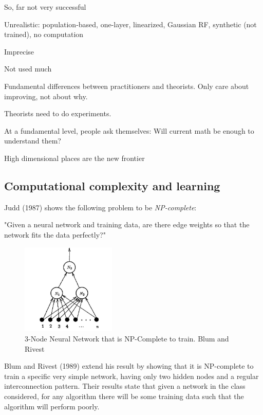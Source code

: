 \documentclass[english]{article}
\begin{document}
\item So, far not very successful
\bitem
\item Unrealistic: population-based, one-layer, linearized, Gaussian RF, synthetic (not trained), no computation
\item Imprecise
\item Not used much
\eitem
\item  Fundamental differences between practitioners and theorists. Only care about improving, not about why. 

\item Theorists need to do experiments. 

\item At a fundamental level, people ask themselves: Will current math be enough to understand them?

High dimensional places are the new frontier
\eitem


\subsection{Computational complexity and learning}

\benum 
\item 
Judd (1987) shows the following
problem to be \emph{NP-complete}:


"Given a neural network and training data, are there edge weights so that the network fits the data perfectly?"

\begin{figure}
  \centering
  \includegraphics[width=0.4\textwidth]{br.png}
  \caption{3-Node Neural Network that is
NP-Complete to train. Blum and Rivest}
\end{figure}


Blum and Rivest (1989) extend his result by showing that it is NP-complete to train a specific very
simple network, having only two hidden nodes and a regular interconnection
pattern. Their results state that given a network in the class considered, for any
algorithm there will be some training data such that the algorithm
will perform poorly.
\end{document}
